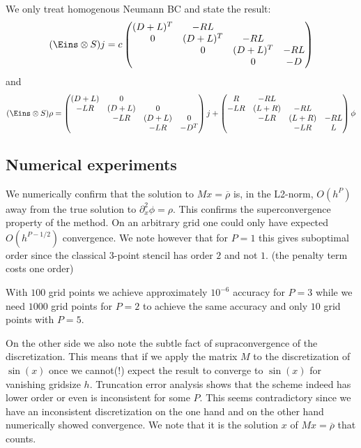 \documentclass[a4paper,12pt]{scrartcl}
\begin{document}
We only treat homogenous Neumann BC and state the result:
\begin{align}
    (\Eins\otimes S) j = c
    \begin{pmatrix}
        (D+L)^T & -RL & &  \\
          0 & (D + L)^T & -RL & \\
            &0& (D + L)^T & -RL \\
            & &0& -D  
    \end{pmatrix}
    \label{}
\end{align}
and 
\begin{align}
    (\Eins\otimes S) \rho =
    \begin{pmatrix}
        (D+L) &0 & &\\
        -LR & (D+L) &0 & \\
            & -LR & (D+L) &0\\
            & & -LR & -D^T
    \end{pmatrix}j+
    \begin{pmatrix}
        R & -RL & &\\
        -LR & (L+R) & -RL&\\
            & -LR & (L+R) & -RL\\
            & & -LR & L
    \end{pmatrix}\phi
    \label{}
\end{align}








\subsection{Numerical experiments}
We numerically confirm that the solution to $Mx=\overline \rho$ is, in the 
L2-norm, $O(h^P)$ away from the true solution to $\partial_x^2 \phi = \rho$.
This confirms the superconvergence property of the method. On an arbitrary grid
one could only have expected $O(h^{P-1/2})$ convergence.
We note however that for $P=1$ this gives suboptimal order since the classical 
$3$-point stencil has order $2$ and not $1$. (the penalty term costs one order)

With $100$ grid points we achieve approximately $10^{-6}$ accuracy for $P=3$ 
while we
need $1000$ grid points for $P=2$ to achieve the same accuracy and only 
$10$ grid points with $P=5$.

On the other side we also note the subtle fact of supraconvergence 
of the discretization. 
This means that if we apply the matrix $M$ to the discretization of $\sin(x)$ once
we cannot(!) expect the result to converge to $\sin(x)$ for vanishing gridsize $h$. 
Truncation error analysis shows that the scheme indeed has lower order or even is 
inconsistent for some $P$. This seems contradictory since we have an inconsistent
discretization on the one hand and on the other hand numerically showed 
convergence. We note that it is the solution $x$ of $Mx=\overline\rho$ that counts.  
\end{document}
